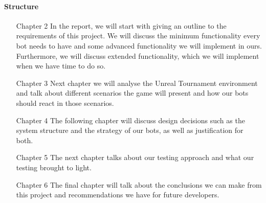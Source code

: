 \paragraph{Structure}
\begin{enumerate}
\item[Chapter 2] In the report, we will start with giving an outline to the requirements of this project. We will discuss the minimum functionality every bot needs to have and some advanced functionality we will implement in ours. Furthermore, we will discuss extended functionality, which we will implement when we have time to do so.

\item[Chapter 3] Next chapter we will analyse the Unreal Tournament environment and talk about different scenarios the game will present and how our bots should react in those scenarios.

\item[Chapter 4] The following chapter will discuss design decisions such as the system structure and the strategy of our bots, as well as justification for both.

\item[Chapter 5] The next chapter talks about our testing approach and what our testing brought to light.

\item[Chapter 6] The final chapter will talk about the conclusions we can make from this project and recommendations we have for future developers.
\end{enumerate}